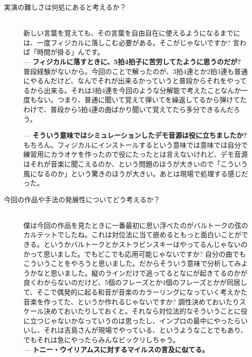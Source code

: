 \documentclass[uplatex,dvipdfmx]{ujarticle}
\begin{document}
\begin{description}
\item [実演の難しさは何処にあると考えるか？]\mbox{}\\

新しい言葉を覚えても、その言葉を自由自在に使えるようになるまでには、一度フィジカルに落しこむ必要がある。そこがじゃないですか? 言わば「時間が掛る」んです。\\

--- {\bf フィジカルに落すときに、5拍4拍子に苦労してたように思うのだが?}\\

普段経験がないから。今回のことで解ったのが、3拍4連とか2拍3連も普通にやるんだけど、なんでそれが出来るかっていうと普段からそれをやってるから出来る。それは3拍4連を今回のような分解能で考えたことなんか一度もない。つまり、普通に聞いて覚えて弾いてを繰返してるから弾けてたわけで、普段から5拍4連の曲ばかり聞いて覚えてたら多分できるんだろう。

--- {\bf そういう意味ではシミュレーションしたデモ音源は役に立ちましたか?}\\

もちろん。フィジカルにインストールするという意味では意味では自分で練習用にカラオケを作ったので役にたったとは言えないけれど、デモ音源はそれが音楽に聞こえるのか、という問題のほうが大きいので「こういう風になるのか」という驚きのほうが大きい。あとは現場で処理する感じだった。\\

\item [今回の作品や手法の発展性についてどう考えるか？]\mbox{}\\

僕は今回の作品を見たときに一番最初に思い浮べたのがバルトークの弦のカルテットでしたね。これは対位法に当て嵌めるともっと面白いことができる。というかバルトークとかストラビンスキーはやってるんじゃないのかって思いました。でもどこでも応用可能じゃないですか? 自分の曲でもこういうことをやろうと思いました。だからそういう意味で分析してみようかなと思いました。縦のラインだけで追ってるとなにが起きてるのかが良くわからないのだけど、5個のフレーズとか4個のフレーズとかが同居して、そこで偶発的に起る和音が音楽のカラーリングになっていく考えかた音楽を作ってた、というか作れるじゃないですか? 調性決めておいたりスケール決めておいたりしておくと。それなら対位法的なそういうことに役に立つじゃないかなっていうのは思ったし、インプロの最中にやったらいいし、それは吉島さんが現場でやっている、というようなことでもあり、でもそれは急にやったらみんなビックリしちゃう。\\

--- {\bf トニー・ウイリアムスに対するマイルスの言及に似てる。}\\


\end{description}
\end{document}
